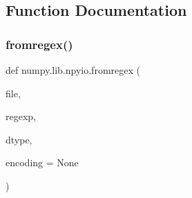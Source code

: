 \subsection{Function Documentation}
\mbox{\label{namespacenumpy_1_1lib_1_1npyio_aae46aabc3e6bd20b257777fe79aa5b36}} 
\subsubsection{\texorpdfstring{fromregex()}{fromregex()}}
{\footnotesize\ttfamily def numpy.\+lib.\+npyio.\+fromregex (\begin{DoxyParamCaption}\item[{}]{file,  }\item[{}]{regexp,  }\item[{}]{dtype,  }\item[{}]{encoding = {\ttfamily None} }\end{DoxyParamCaption})}

